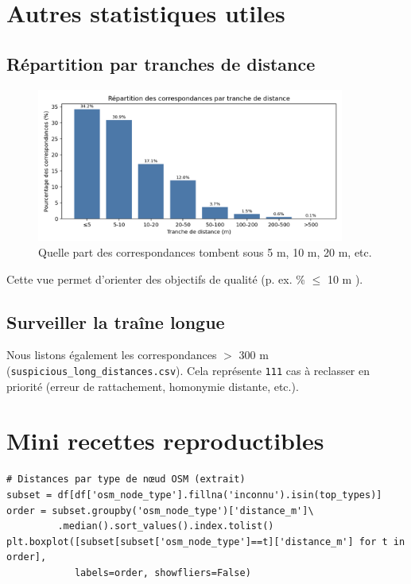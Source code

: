 \section{Autres statistiques utiles}

\subsection*{Répartition par tranches de distance}

\begin{figure}[h]
    \centering
    \includegraphics[width=0.9\textwidth]{../figures/chap5/distance_coverage_buckets.png}
    \caption[Tranches de distance]{Quelle part des correspondances tombent sous 5 m, 10 m, 20 m, etc.}
\end{figure}

Cette vue permet d'orienter des objectifs de qualité (p. ex. \% \(\leq\) 10 m \fg{}).

\subsection*{Surveiller la traîne longue}

Nous listons également les correspondances \(>\) 300 m (\texttt{suspicious\_long\_distances.csv}). 
Cela représente \texttt{111} cas à reclasser en priorité (erreur de rattachement, homonymie distante, etc.).

\section{Mini recettes reproductibles}

\begin{verbatim}
# Distances par type de nœud OSM (extrait)
subset = df[df['osm_node_type'].fillna('inconnu').isin(top_types)]
order = subset.groupby('osm_node_type')['distance_m']\
         .median().sort_values().index.tolist()
plt.boxplot([subset[subset['osm_node_type']==t]['distance_m'] for t in order],
            labels=order, showfliers=False)
\end{verbatim}

